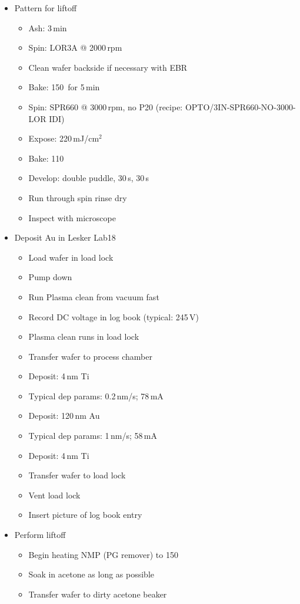 \begin{itemize}
\item Pattern for liftoff
\begin{itemize}
\item Ash: 3\,min
\item Spin: LOR3A @ 2000\,rpm
\item Clean wafer backside if necessary with EBR
\item Bake: 150\,\textcelsius\,\,for 5\,min
\item Spin: SPR660 @ 3000\,rpm, no P20 (recipe: OPTO/3IN-SPR660-NO-3000-LOR IDI)
\item Expose: 220\,mJ/cm$^2$
\item Bake: 110\,\textcelsius\
\item Develop: double puddle, 30\,s, 30\,s
\item Run through spin rinse dry
\item Inspect with microscope
\end{itemize}
\item Deposit Au in Lesker Lab18
\begin{itemize}
\item Load wafer in load lock
\item Pump down
\item Run Plasma clean from vacuum fast
\item Record DC voltage in log book (typical: 245\,V)
\item Plasma clean runs in load lock
\item Transfer wafer to process chamber
\item Deposit: 4\,nm Ti
\item Typical dep params: 0.2\,nm/s; 78\,mA
\item Deposit: 120\,nm Au
\item Typical dep params: 1\,nm/s; 58\,mA
\item Deposit: 4\,nm Ti
\item Transfer wafer to load lock
\item Vent load lock
\item Insert picture of log book entry
\end{itemize}
\item Perform liftoff
\begin{itemize}
\item Begin heating NMP (PG remover) to 150\textcelsius
\item Soak in acetone as long as possible
\item Transfer wafer to dirty acetone beaker

\end{itemize}
\end{itemize}
